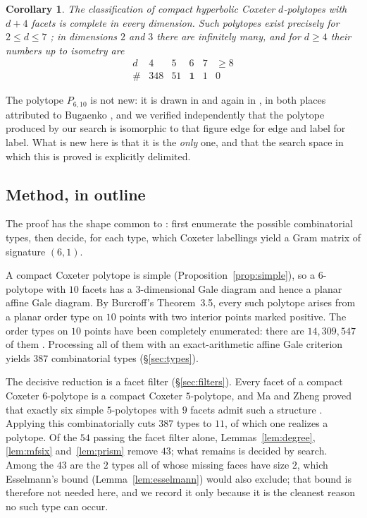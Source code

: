 \documentclass[11pt,reqno]{amsart}
\theoremstyle{plain}
\newtheorem{corollary}[theorem]{Corollary}
\theoremstyle{definition}
\newcommand{\PP}{P_{6,10}}
\newcommand{\NumOrderTypes}{14{,}309{,}547}
\newcommand{\NumTypes}{387}
\newcommand{\NumSurvivors}{54}
\newcommand{\NumRequired}{11}
\newcommand{\NumRedundant}{43}
\newcommand{\NumThreeFree}{2}
\begin{document}
\begin{corollary}
\label{cor:complete}
The classification of compact hyperbolic Coxeter $d$-polytopes with $d+4$ facets
is complete in every dimension. Such polytopes exist precisely for
$2\le d\le 7$ \cite{FeliksonTumarkin2008}; in dimensions $2$ and $3$ there are
infinitely many, and for $d\ge4$ their numbers up to isometry are
\[
\begin{array}{c|ccccc}
d      & 4   & 5  & 6 & 7 & \ge 8\\\hline
\#     & 348 & 51 & \mathbf{1} & 1 & 0
\end{array}
\]
\end{corollary}

The polytope $\PP$ is not new: it is drawn in \cite[Fig.~5]{Burcroff2021} and
again in \cite[Fig.~5]{Burcroff2024}, in both places attributed to Bugaenko
\cite{Bugaenko1984}, and we verified independently that the
polytope produced by our search is isomorphic to that figure edge for edge and
label for label.
What is new here is that it is the \emph{only} one, and that the search space in
which this is proved is explicitly delimited.


\subsection*{Method, in outline}
The proof has the shape common to \cite{Burcroff2024,MaZheng2024,MaZheng2023}:
first enumerate the possible combinatorial types, then decide, for each type,
which Coxeter labellings yield a Gram matrix of signature $(6,1)$.

A compact Coxeter polytope is simple (Proposition~\ref{prop:simple}), so a
$6$-polytope with $10$ facets has a $3$-dimensional Gale diagram and hence a
planar affine Gale diagram. By Burcroff's Theorem~3.5, every such polytope
arises from a planar order type on $10$ points with two interior points marked
positive. The order types on $10$ points have been completely enumerated: there
are $\NumOrderTypes$ of them \cite{AichholzerAurenhammerKrasser2002,
AichholzerKrasser2001,OrderTypeDB}. Processing all of them with an
exact-arithmetic affine Gale criterion yields $\NumTypes$ combinatorial types
(\S\ref{sec:types}).

The decisive reduction is a facet filter (\S\ref{sec:filters}). Every facet of
a compact Coxeter $6$-polytope is a compact Coxeter $5$-polytope, and Ma and
Zheng proved that exactly six simple $5$-polytopes with $9$ facets admit such a
structure \cite[\S6]{MaZheng2023}. Applying this combinatorially cuts
$\NumTypes$ types to $\NumRequired$, of which one realizes a polytope. Of the
$\NumSurvivors$ passing the facet filter alone, Lemmas~\ref{lem:degree},
\ref{lem:mfsix} and~\ref{lem:prism} remove $\NumRedundant$; what remains is decided
by search. Among the $\NumRedundant$ are the $\NumThreeFree$ types all of whose
missing faces have size $2$, which Esselmann's bound (Lemma~\ref{lem:esselmann})
would also exclude; that bound is therefore not needed here, and we record it only
because it is the cleanest reason no such type can occur.
\end{document}
